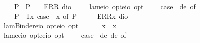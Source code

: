 \begin{isabellebody}
\ \ \ \ P{\isacharparenleft}{\isasympsi}{\isacharparenright}\ {\isasymRightarrow}\ P{\isacharparenleft}{\isasympsi}{\isacharparenright}\ {\isacharbar}\ {\isacharunderscore}\ {\isasymRightarrow}\ ERR\ dio{\isachardoublequoteclose}\ \ \isanewline
\ \isamarkupfalse%
\ lam{\isacharcolon}{\isacharcolon}{\isachardoublequoteopen}{\isacharparenleft}e{\isasymRightarrow}io\ opt{\isacharparenright}{\isasymRightarrow}{\isacharparenleft}e{\isasymRightarrow}io{\isacharparenright}\ opt{\isachardoublequoteclose}\ {\isacharparenleft}{\isachardoublequoteopen}\isactrlbold {\isasymlambda}{\isachardoublequoteclose}{\isacharparenright}\ \ {\isachardoublequoteopen}\isactrlbold {\isasymlambda}{\isasymPhi}\ {\isasymequiv}\ case\ {\isacharparenleft}{\isasymPhi}\ de{\isacharparenright}\ of\isanewline
\ \ \ \ P{\isacharparenleft}{\isacharunderscore}{\isacharparenright}\ {\isasymRightarrow}\ T{\isacharparenleft}{\isasymlambda}x{\isachardot}\ case\ {\isacharparenleft}{\isasymPhi}\ x{\isacharparenright}\ of\ P{\isacharparenleft}{\isasymphi}{\isacharparenright}\ {\isasymRightarrow}\ {\isasymphi}{\isacharparenright}\ {\isacharbar}\ {\isacharunderscore}\ {\isasymRightarrow}\ ERR{\isacharparenleft}{\isasymlambda}x{\isachardot}\ dio{\isacharparenright}{\isachardoublequoteclose}\isanewline
\ \isamarkupfalse%
\ lamBinder{\isacharcolon}{\isacharcolon}{\isachardoublequoteopen}{\isacharparenleft}e{\isasymRightarrow}io\ opt{\isacharparenright}{\isasymRightarrow}{\isacharparenleft}e{\isasymRightarrow}io{\isacharparenright}\ opt{\isachardoublequoteclose}\ {\isacharparenleft}\ {\isachardoublequoteopen}\isactrlbold {\isasymlambda}{\isachardoublequoteclose}\ {\isacharbrackleft}{}{\isacharbrackright}\ {}{\isacharparenright}\ \ \ {\isachardoublequoteopen}\isactrlbold {\isasymlambda}x{\isachardot}\ {\isasymphi}\ x\ {\isasymequiv}\ \isactrlbold {\isasymlambda}\ {\isasymphi}{\isachardoublequoteclose}\isanewline
\ \isamarkupfalse%
\ lam{}{\isacharcolon}{\isacharcolon}{\isachardoublequoteopen}{\isacharparenleft}e{\isasymRightarrow}e{\isasymRightarrow}io\ opt{\isacharparenright}{\isasymRightarrow}{\isacharparenleft}e{\isasymRightarrow}e{\isasymRightarrow}io{\isacharparenright}\ opt{\isachardoublequoteclose}\ {\isacharparenleft}{\isachardoublequoteopen}\isactrlbold {\isasymlambda}\ \ {\isachardoublequoteopen}\isactrlbold {\isasymlambda}\ {\isasymequiv}\ case\ {\isacharparenleft}{\isasymPhi}\ de\ de{\isacharparenright}\ of\isanewline

\end{isabellebody}
